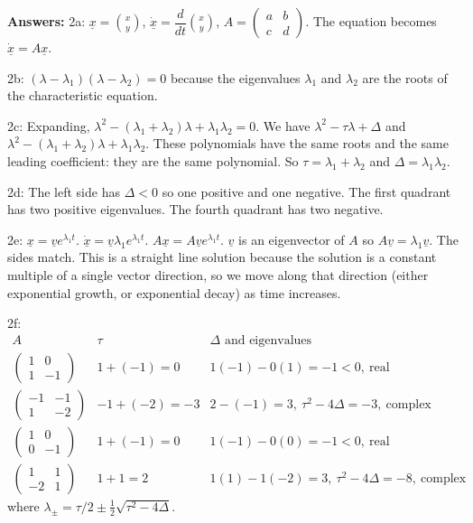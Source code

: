 \documentclass[12pt]{amsart}
\theoremstyle{conjecture}
\theoremstyle{definition}
\theoremstyle{question}
\theoremstyle{theorem}
\newcommand{\vct}[1]{\underline{#1}}
\begin{document}
    \textbf{Answers:} 2a: $\vct{x}=\binom{x}{y}$, $\dot{\vct{x}}=\dfrac d{dt}\binom{x}{y}$, $A=\begin{pmatrix}a&b\\c&d\end{pmatrix}$. The equation becomes $\dot{\vct{x}}=A\vct{x}$.

    2b: $(\lambda-\lambda_1)(\lambda-\lambda_2)=0$ because the eigenvalues $\lambda_1$ and $\lambda_2$ are the roots of the characteristic equation.

    2c: Expanding, $\lambda^2-(\lambda_1+\lambda_2)\lambda+\lambda_1\lambda_2=0$. We have $\lambda^2-\tau\lambda+\Delta$ and $\lambda^2-(\lambda_1+\lambda_2)\lambda+\lambda_1\lambda_2$. These polynomials have the same roots and the same leading coefficient: they are the same polynomial. So $\tau=\lambda_1+\lambda_2$ and $\Delta=\lambda_1\lambda_2$.

    2d: The left side has $\Delta<0$ so one positive and one negative. The first quadrant has two positive eigenvalues. The fourth quadrant has two negative.

    \scriptsize
    2e: $\vct{x}=\vct{v}e^{\lambda_1t}$. $\dot{\vct{x}}=\vct{v}\lambda_1e^{\lambda_1t}$. $A\vct{x}=A\vct{v}e^{\lambda_1t}$. $\vct{v}$ is an eigenvector of $A$ so $A\vct{v}=\lambda_1\vct{v}$. The sides match. This is a straight line solution because the solution is a constant multiple of a single vector direction, so we move along that direction (either exponential growth, or exponential decay) as time increases.

    2f:
    \[
        \begin{array}{c|l|l}
            A&\tau&\Delta\text{ and eigenvalues}\\\hline
            \begin{pmatrix}1&0\\1&-1\end{pmatrix}&1+(-1)=0&1(-1)-0(1)=-1<0,\ \text{real}\\[6pt]
            \begin{pmatrix}-1&-1\\1&-2\end{pmatrix}&-1+(-2)=-3&2-(-1)=3,\ \tau^2-4\Delta=-3,\ \text{complex}\\[6pt]
            \begin{pmatrix}1&0\\0&-1\end{pmatrix}&1+(-1)=0&1(-1)-0(0)=-1<0,\ \text{real}\\[6pt]
            \begin{pmatrix}1&1\\-2&1\end{pmatrix}&1+1=2&1(1)-1(-2)=3,\ \tau^2-4\Delta=-8,\ \text{complex}
        \end{array}
    \]
    where $\lambda_\pm=\tau/2\pm\frac12\sqrt{\tau^2-4\Delta}$.
\end{document}
